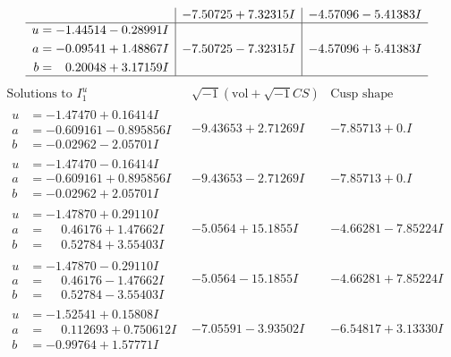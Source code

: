 \documentclass[1p]{elsarticle_modified}
\theoremstyle{definition}
\newcommand{\I}{\sqrt{-1}}
\begin{document}
$$\begin{array}{c|c|c}
 & -7.50725 + 7.32315 I & -4.57096 - 5.41383 I \\ \hline\begin{aligned}
u &= -1.44514 - 0.28991 I \\
a &= -0.09541 + 1.48867 I \\
b &= \phantom{-}0.20048 + 3.17159 I\end{aligned}
 & -7.50725 - 7.32315 I & -4.57096 + 5.41383 I\\
 \hline 
 \end{array}$$\newpage$$\begin{array}{c|c|c}  
\text{Solutions to }I^u_{1}& \I (\text{vol} + \sqrt{-1}CS) & \text{Cusp shape}\\
 \hline 
\begin{aligned}
u &= -1.47470 + 0.16414 I \\
a &= -0.609161 - 0.895856 I \\
b &= -0.02962 - 2.05701 I\end{aligned}
 & -9.43653 + 2.71269 I & -7.85713 + 0. I\phantom{ +0.000000I} \\ \hline\begin{aligned}
u &= -1.47470 - 0.16414 I \\
a &= -0.609161 + 0.895856 I \\
b &= -0.02962 + 2.05701 I\end{aligned}
 & -9.43653 - 2.71269 I & -7.85713 + 0. I\phantom{ +0.000000I} \\ \hline\begin{aligned}
u &= -1.47870 + 0.29110 I \\
a &= \phantom{-}0.46176 + 1.47662 I \\
b &= \phantom{-}0.52784 + 3.55403 I\end{aligned}
 & -5.0564 + 15.1855 I & -4.66281 - 7.85224 I \\ \hline\begin{aligned}
u &= -1.47870 - 0.29110 I \\
a &= \phantom{-}0.46176 - 1.47662 I \\
b &= \phantom{-}0.52784 - 3.55403 I\end{aligned}
 & -5.0564 - 15.1855 I & -4.66281 + 7.85224 I \\ \hline\begin{aligned}
u &= -1.52541 + 0.15808 I \\
a &= \phantom{-}0.112693 + 0.750612 I \\
b &= -0.99764 + 1.57771 I\end{aligned}
 & -7.05591 - 3.93502 I & -6.54817 + 3.13330 I \\ \hline\begin{aligned}

\end{aligned}
\end{array}$$
\end{document}
